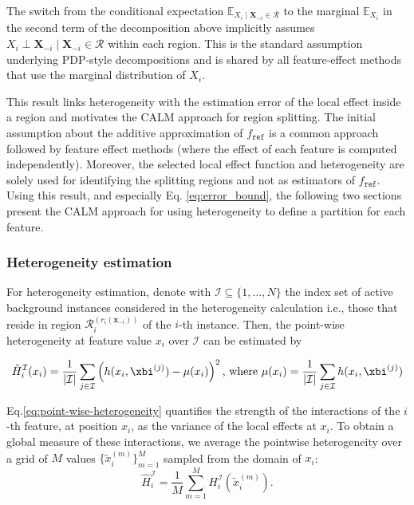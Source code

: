 \begin{remark}
The switch from the conditional expectation $\mathbb{E}_{X_i \mid \mathbf{X}_{-i} \in \mathcal{R}}$ to the marginal $\mathbb{E}_{X_i}$ in the second term of the decomposition above implicitly assumes $X_i \perp \mathbf{X}_{-i} \mid \mathbf{X}_{-i} \in \mathcal{R}$ within each region. This is the standard assumption underlying PDP-style decompositions and is shared by all feature-effect methods that use the marginal distribution of $X_i$.
\end{remark}

This result links heterogeneity with the estimation error of the local effect inside a region and motivates the CALM approach for region splitting. The initial assumption about the additive approximation of $f_{\texttt{ref}}$ is a common approach followed by feature effect methods (where the effect of each feature is computed independently). Moreover, the selected local effect function and heterogeneity are solely used for identifying the splitting regions and not as estimators of $f_{\texttt{ref}}$. Using this result, and especially Eq. \eqref{eq:error_bound}, the following two sections present the CALM approach for using heterogeneity to define a partition for each feature. 

\subsubsection{Heterogeneity estimation}

For heterogeneity estimation, denote with $\mathcal{I} \subseteq \{1, \ldots, N\} $ the index set of active background instances considered in the heterogeneity calculation i.e., those that reside in region $\mathcal{R}^{(r_i(\mathbf{x}_{-i}))}_i$ of the $i$-th instance.
Then, the point-wise heterogeneity at feature value $x_i$ over $\mathcal{I}$ can be estimated by

\begin{equation}\label{eq:point-wise-heterogeneity}
\hat{H}_i^{\mathcal{I}}(x_i) = \frac{1}{|\mathcal{I}|}\sum_{j \in \mathcal{I}} \left ( h(x_i , \xbi^{(j)}) - \mu(x_i) \right )^2 \text{, where } \mu(x_i)=\frac{1}{|\mathcal{I}|} \sum_{j \in \mathcal{I}} h(x_i , \xbi^{(j)})
\end{equation}

Eq.\eqref{eq:point-wise-heterogeneity} quantifies the strength of the interactions of the $i$-th feature, at position $x_i$, as 
the variance of the local effects at $x_i$.
To obtain a global measure of these interactions, we average the pointwise heterogeneity over a grid of $M$ values $\{ {\tilde{x}_i^{(m)}} \}_{m=1}^M$ sampled from the domain of $x_i$:
\begin{equation}
\label{eq:heter-definition}
\hat{H}_i^{\mathcal{I}} = \frac{1}{M} \sum_{m=1}^M H_i^{\mathcal{I}}(\tilde{x}_i^{(m)}).
\end{equation}

